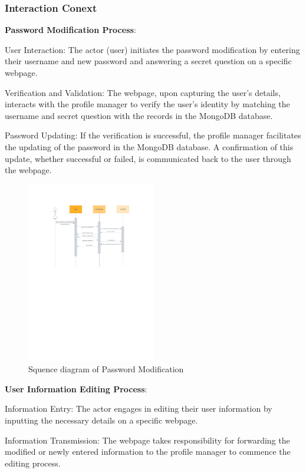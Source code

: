 \documentclass[conference]{IEEEtran}
\begin{document}
\subsubsection{\textbf{Interaction Conext }}
\textbf{ }

\textbf{ Password Modification Process}:

User Interaction: The actor (user) initiates the password modification by entering their username and new password and answering a secret question on a specific webpage.

Verification and Validation: The webpage, upon capturing the user's details, interacts with the profile manager to verify the user's identity by matching the username and secret question with the records in the MongoDB database.

Password Updating: If the verification is successful, the profile manager facilitates the updating of the password in the MongoDB database. A confirmation of this update, whether successful or failed, is communicated back to the user through the webpage.
\begin{figure}[htbp]
	\centerline{\includegraphics[width=0.5\textwidth]{Diagram_of_Editing_Info_and_Password/Sequence_diagram_of_Changing_psw.pdf}}
	\caption{Squence diagram of Password Modification }
	\label{Sequence_diagram_of_Changing_psw}
\end{figure}
\textbf{ User Information Editing Process}:

Information Entry: The actor engages in editing their user information by inputting the necessary details on a specific webpage.

Information Transmission: The webpage takes responsibility for forwarding the modified or newly entered information to the profile manager to commence the editing process.
\end{document}

